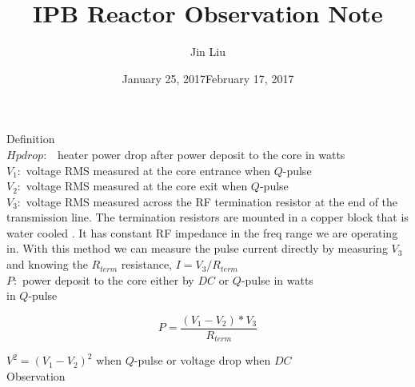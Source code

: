 \documentclass{article}
\title{IPB Reactor Observation Note}
\author{Jin Liu}
\date{January 25, 2017}
\date{February 17, 2017}
\begin{document}
\maketitle

Definition\\

$Hpdrop:$ \ heater power drop after power deposit to the core in watts\\

$V_{1}:$ voltage RMS measured at the core entrance when $Q$-pulse\\

$V_{2}:$ voltage RMS measured at the core exit when $Q$-pulse\\

$V_{3}:$ voltage RMS measured across the RF termination resistor at the end of the transmission line. The termination resistors are mounted in a copper block that is water cooled . It has constant RF impedance in the freq range we are operating in. With this method we can measure the pulse current directly by measuring $V_{3}$ and knowing the $R_{term}$ resistance, $I = V_{3} / R_{term}$ \\

$P:$ power deposit to the core either by $DC$ or $Q$-pulse in watts\\
in $Q$-pulse 

\begin{equation}
P=\frac{(V_{1}-V_{2})*V_{3}}{R_{term}} \label{1}%
\end{equation}
%

$V^{2}=(V_{1}-V_{2})^{2}$ when $Q$-pulse or voltage drop when $DC$ \\


Observation\\
\end{document}
